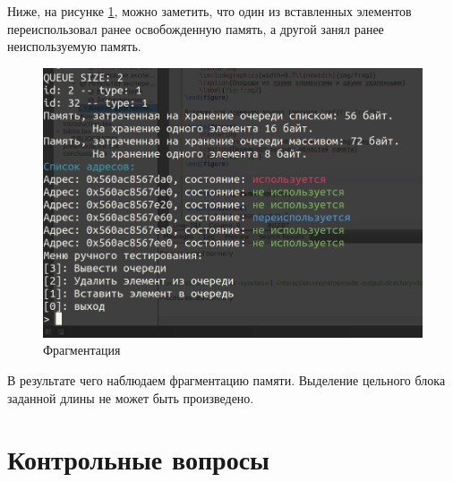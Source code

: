 \clearpage

Ниже, на рисунке \ref{fig:frag5}, можно заметить, что один из вставленных элементов переиспользовал ранее освобожденную память, а другой занял ранее неиспользуемую память.

\begin{figure}
	\centering
	\includegraphics[width=0.6\linewidth]{img/frag5}
	\caption{Фрагментация}
	\label{fig:frag5}
\end{figure}

В результате чего наблюдаем фрагментацию памяти. Выделение цельного блока заданной длины не может быть произведено.


\chapter{Контрольные вопросы}

